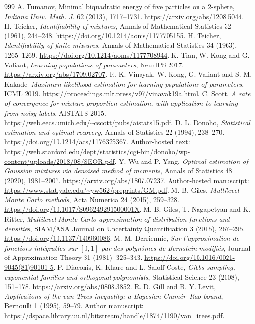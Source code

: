 \documentclass[11pt,a4paper]{article}
\theoremstyle{definition}\newtheorem{definition}[theorem]{Definition}
\theoremstyle{remark}\newtheorem{remark}[theorem]{Remark}
\numberwithin{equation}{section}
\begin{document}
\begin{thebibliography}{999}
 A. Tumanov, Minimal biquadratic energy of five particles on a 2-sphere, \emph{Indiana Univ. Math. J.} 62 (2013), 1717--1731. \url{https://arxiv.org/abs/1208.5044}.
 H. Teicher, \emph{Identifiability of mixtures}, Annals of Mathematical Statistics 32 (1961), 244--248. \url{https://doi.org/10.1214/aoms/1177705155}.
 H. Teicher, \emph{Identifiability of finite mixtures}, Annals of Mathematical Statistics 34 (1963), 1265--1269. \url{https://doi.org/10.1214/aoms/1177708944}.
 K. Tian, W. Kong and G. Valiant, \emph{Learning populations of parameters}, NeurIPS 2017. \url{https://arxiv.org/abs/1709.02707}.
 R. K. Vinayak, W. Kong, G. Valiant and S. M. Kakade, \emph{Maximum likelihood estimation for learning populations of parameters}, ICML 2019. \url{https://proceedings.mlr.press/v97/vinayak19a.html}.
 C. Scott, \emph{A rate of convergence for mixture proportion estimation, with application to learning from noisy labels}, AISTATS 2015. \url{https://web.eecs.umich.edu/~cscott/pubs/aistats15.pdf}.
 D. L. Donoho, \emph{Statistical estimation and optimal recovery}, Annals of Statistics 22 (1994), 238--270. \url{https://doi.org/10.1214/aos/1176325367}. Author-hosted text: \url{https://web.stanford.edu/dept/statistics/cgi-bin/donoho/wp-content/uploads/2018/08/SEOR.pdf}.
 Y. Wu and P. Yang, \emph{Optimal estimation of Gaussian mixtures via denoised method of moments}, Annals of Statistics 48 (2020), 1981--2007. \url{https://arxiv.org/abs/1807.07237}. Author-hosted manuscript: \url{https://www.stat.yale.edu/~yw562/preprints/GM.pdf}.
 M. B. Giles, \emph{Multilevel Monte Carlo methods}, Acta Numerica 24 (2015), 259--328. \url{https://doi.org/10.1017/S096249291500001X}.
 M. B. Giles, T. Nagapetyan and K. Ritter, \emph{Multilevel Monte Carlo approximation of distribution functions and densities}, SIAM/ASA Journal on Uncertainty Quantification 3 (2015), 267--295. \url{https://doi.org/10.1137/140960086}.
 M.-M. Derriennic, \emph{Sur l'approximation de fonctions int\'egrables sur $[0,1]$ par des polyn\^omes de Bernstein modifi\'es}, Journal of Approximation Theory 31 (1981), 325--343. \url{https://doi.org/10.1016/0021-9045(81)90101-5}.
 P. Diaconis, K. Khare and L. Saloff-Coste, \emph{Gibbs sampling, exponential families and orthogonal polynomials}, Statistical Science 23 (2008), 151--178. \url{https://arxiv.org/abs/0808.3852}.
 R. D. Gill and B. Y. Levit, \emph{Applications of the van Trees inequality: a Bayesian Cram\'er--Rao bound}, Bernoulli 1 (1995), 59--79. Author manuscript: \url{https://dspace.library.uu.nl/bitstream/handle/1874/1190/van_trees.pdf}.

\end{thebibliography}
\end{document}
